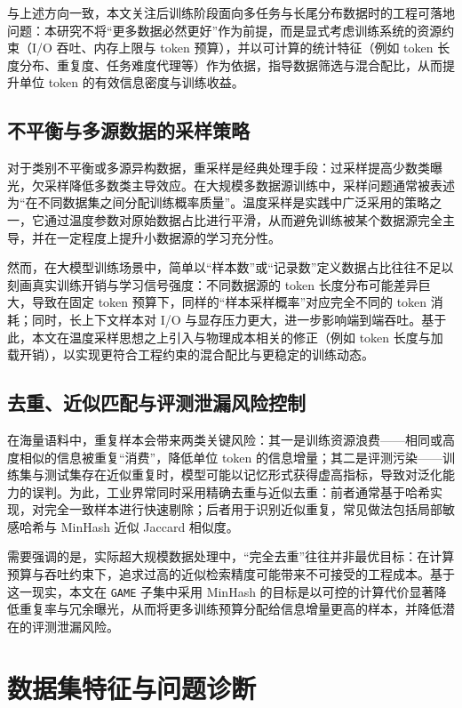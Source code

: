 \documentclass[UTF8]{article}
\begin{document}
与上述方向一致，本文关注后训练阶段面向多任务与长尾分布数据时的工程可落地问题：本研究不将“更多数据必然更好”作为前提，而是显式考虑训练系统的资源约束（I/O 吞吐、内存上限与 token 预算），并以可计算的统计特征（例如 token 长度分布、重复度、任务难度代理等）作为依据，指导数据筛选与混合配比，从而提升单位 token 的有效信息密度与训练收益。

\subsection{不平衡与多源数据的采样策略}
对于类别不平衡或多源异构数据，重采样是经典处理手段：过采样提高少数类曝光，欠采样降低多数类主导效应。在大规模多数据源训练中，采样问题通常被表述为“在不同数据集之间分配训练概率质量”。温度采样是实践中广泛采用的策略之一，它通过温度参数对原始数据占比进行平滑，从而避免训练被某个数据源完全主导，并在一定程度上提升小数据源的学习充分性。

然而，在大模型训练场景中，简单以“样本数”或“记录数”定义数据占比往往不足以刻画真实训练开销与学习信号强度：不同数据源的 token 长度分布可能差异巨大，导致在固定 token 预算下，同样的“样本采样概率”对应完全不同的 token 消耗；同时，长上下文样本对 I/O 与显存压力更大，进一步影响端到端吞吐。基于此，本文在温度采样思想之上引入与物理成本相关的修正（例如 token 长度与加载开销），以实现更符合工程约束的混合配比与更稳定的训练动态。

\subsection{去重、近似匹配与评测泄漏风险控制}
在海量语料中，重复样本会带来两类关键风险：其一是训练资源浪费——相同或高度相似的信息被重复“消费”，降低单位 token 的信息增量；其二是评测污染——训练集与测试集存在近似重复时，模型可能以记忆形式获得虚高指标，导致对泛化能力的误判。为此，工业界常同时采用精确去重与近似去重：前者通常基于哈希实现，对完全一致样本进行快速剔除；后者用于识别近似重复，常见做法包括局部敏感哈希与 MinHash 近似 Jaccard 相似度。\citep{broder1997resemblance}

需要强调的是，实际超大规模数据处理中，“完全去重”往往并非最优目标：在计算预算与吞吐约束下，追求过高的近似检索精度可能带来不可接受的工程成本。基于这一现实，本文在 \texttt{GAME} 子集中采用 MinHash 的目标是以可控的计算代价显著降低重复率与冗余曝光，从而将更多训练预算分配给信息增量更高的样本，并降低潜在的评测泄漏风险。


\section{数据集特征与问题诊断}\label{sec:data_profile}
\end{document}
